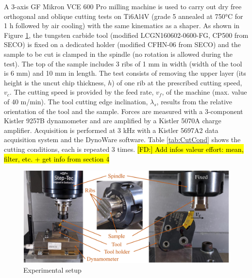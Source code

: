 \documentclass[final,5p,times,twocolumn]{elsarticle}
\DeclareRobustCommand{\FD}[1]{ {\begingroup\sethlcolor{VWgreen}\textcolor{black}{\hl{[FD:] #1}}\endgroup} }
\begin{document}
A 3-axis GF Mikron VCE 600 Pro milling machine is used to carry out dry free orthogonal and oblique cutting tests on Ti6Al4V (grade 5 annealed at 750°C for 1 h followed by air cooling) with the same kinematics as a shaper. As shown in Figure \ref{ExpSetup}, the tungsten carbide tool (modified LCGN160602-0600-FG, CP500 from SECO) is fixed on a dedicated holder (modified CFHN-06 from SECO) and the sample to be cut is clamped in the spindle (no rotation is allowed during the test). The top of the sample includes 3 ribs of 1 mm in width (width of the tool is 6 mm) and 10 mm in length. The test consists of removing the upper layer (its height is the uncut chip thickness, $h$) of one rib at the prescribed cutting speed, $v_c$. The cutting speed is provided by the feed rate, $v_f$, of the machine (max. value of 40 m/min). The tool cutting edge inclination, $\lambda_s$, results from the relative orientation of the tool and the sample. Forces are measured with a 3-component Kistler 9257B dynamometer and are amplified by a Kistler 5070A charge amplifier. Acquisition is performed at 3 kHz with a Kistler 5697A2 data acquisition system and the DynoWare software. Table \ref{tab:CutCond} shows the cutting conditions, each is repeated 3 times. \FD{Add infos valeur effort: mean, filter, etc. + get info from section 4}

\begin{figure}[h]
\centering
\includegraphics[width=\columnwidth]{Figures/ExpSetup}
\caption{Experimental setup}
\label{ExpSetup}
\end{figure}
\end{document}
